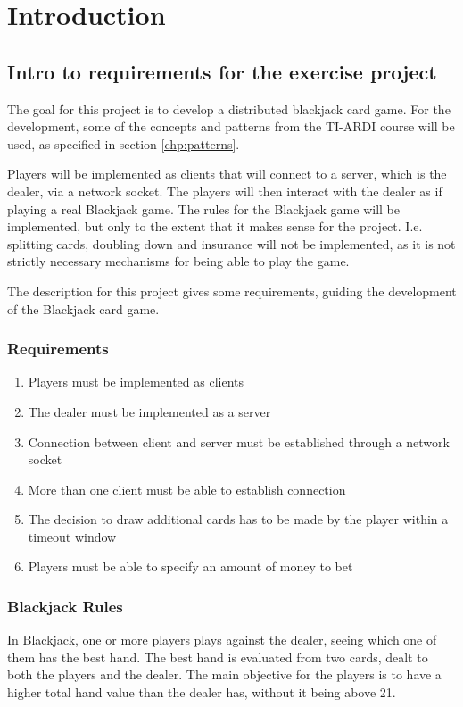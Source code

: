 \chapter{Introduction}
\label{chp:intro}

\section{Intro to requirements for the exercise project}

The goal for this project is to develop a distributed blackjack card game. For the development, some of the concepts and patterns from the TI-ARDI course will be used, as specified in section \ref{chp:patterns}. 

Players will be implemented as clients that will connect to a server, which is the dealer, via a network socket. The players will then interact with the dealer as if playing a real Blackjack game. The rules for the Blackjack game will be implemented, but only to the extent that it makes sense for the project. I.e. splitting cards, doubling down and insurance will not be implemented, as it is not strictly necessary mechanisms for being able to play the game. 

The description for this project gives some requirements, guiding the development of the Blackjack card game.
\subsection{Requirements}
\begin{enumerate}  
	\item Players must be implemented as clients
	\item The dealer must be implemented as a server
	\item Connection between client and server must be established through a network socket
	\item More than one client must be able to establish connection
	\item The decision to draw additional cards has to be made by the player within a timeout window
	\item Players must be able to specify an amount of money to bet
\end{enumerate}

\subsection{Blackjack Rules}
In Blackjack, one or more players plays against the dealer, seeing which one of them has the best hand. The best hand is evaluated from two cards, dealt to both the players and the dealer. The main objective for the players is to have a higher total hand value than the dealer has, without it being above 21.
 
